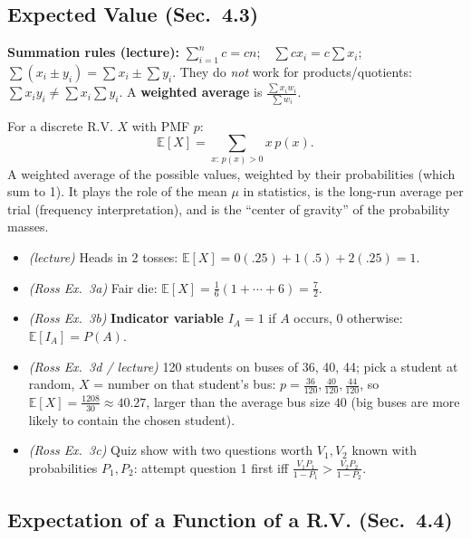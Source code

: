 \documentclass[11pt]{article}
\let\oldsubsection\subsection
\renewcommand{\subsection}{\Needspace{14\baselineskip}\oldsubsection}
\newcommand{\E}{\mathbb{E}}
\begin{document}
\subsection{Expected Value (Sec.\ 4.3)}

\textbf{Summation rules (lecture):} $\sum_{i=1}^nc=cn$;\ \ $\sum cx_i=c\sum x_i$;\ \ $\sum(x_i\pm y_i)=\sum x_i\pm\sum y_i$. They do \emph{not} work for products/quotients: $\sum x_iy_i\ne\sum x_i\sum y_i$. A \textbf{weighted average} is $\frac{\sum x_iw_i}{\sum w_i}$.

\begin{defbox}
For a discrete R.V. $X$ with PMF $p$:
\[ \E[X]=\sum_{x:\,p(x)>0}x\,p(x). \]
A weighted average of the possible values, weighted by their probabilities (which sum to 1). It plays the role of the mean $\mu$ in statistics, is the long-run average per trial (frequency interpretation), and is the ``center of gravity'' of the probability masses.
\end{defbox}

\begin{exbox}[Examples]
\begin{itemize}
\item \emph{(lecture)} Heads in 2 tosses: $\E[X]=0(.25)+1(.5)+2(.25)=1$.
\item \emph{(Ross Ex.\ 3a)} Fair die: $\E[X]=\frac16(1+\cdots+6)=\frac72$.
\item \emph{(Ross Ex.\ 3b)} \textbf{Indicator variable} $I_A=1$ if $A$ occurs, $0$ otherwise: $\E[I_A]=P(A)$.
\item \emph{(Ross Ex.\ 3d / lecture)} 120 students on buses of 36, 40, 44; pick a student at random, $X$ = number on that student's bus: $p=\frac{36}{120},\frac{40}{120},\frac{44}{120}$, so $\E[X]=\frac{1208}{30}\approx40.27$, larger than the average bus size $40$ (big buses are more likely to contain the chosen student).
\item \emph{(Ross Ex.\ 3c)} Quiz show with two questions worth $V_1,V_2$ known with probabilities $P_1,P_2$: attempt question 1 first iff $\frac{V_1P_1}{1-P_1}>\frac{V_2P_2}{1-P_2}$.
\end{itemize}
\end{exbox}

\subsection{Expectation of a Function of a R.V. (Sec.\ 4.4)}
\end{document}
